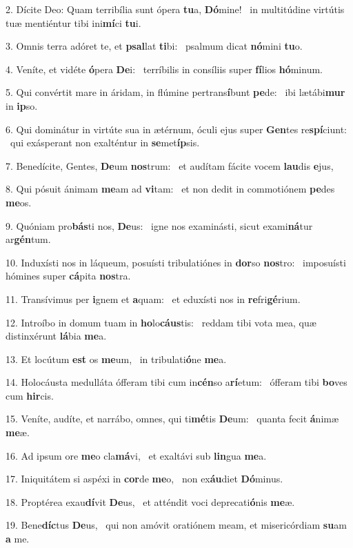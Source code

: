 2. Dícite Deo: Quam terribília sunt ópera \textbf{tu}a, \textbf{Dó}mine! \ast\  in multitúdine virtútis tuæ mentiéntur tibi ini\textbf{mí}ci \textbf{tu}i.\

3. Omnis terra adóret te, et \textbf{psal}lat \textbf{ti}bi: \ast\  psalmum dicat \textbf{nó}mini \textbf{tu}o.\

4. Veníte, et vidéte \textbf{ó}pera \textbf{De}i: \ast\  terríbilis in consíliis super \textbf{fí}lios \textbf{hó}minum.\

5. Qui convértit mare in áridam, in flúmine pertrans\textbf{í}bunt \textbf{pe}de: \ast\  ibi lætábi\textbf{mur} in \textbf{ip}so.\

6. Qui dominátur in virtúte sua in ætérnum, óculi ejus super \textbf{Gen}tes re\textbf{spí}ciunt: \ast\  qui exásperant non exalténtur in \textbf{se}met\textbf{íp}sis.\

7. Benedícite, Gentes, \textbf{De}um \textbf{nos}trum: \ast\  et audítam fácite vocem \textbf{lau}dis \textbf{e}jus,\

8. Qui pósuit ánimam \textbf{me}am ad \textbf{vi}tam: \ast\  et non dedit in commotiónem \textbf{pe}des \textbf{me}os.\

9. Quóniam pro\textbf{bás}ti nos, \textbf{De}us: \ast\  igne nos examinásti, sicut exami\textbf{ná}tur ar\textbf{gén}tum.\

10. Induxísti nos in láqueum, posuísti tribulatiónes in \textbf{dor}so \textbf{nos}tro: \ast\  imposuísti hómines super \textbf{cá}pita \textbf{nos}tra.\

11. Transívimus per \textbf{i}gnem et \textbf{a}quam: \ast\  et eduxísti nos in \textbf{re}fri\textbf{gé}rium.\

12. Introíbo in domum tuam in \textbf{ho}lo\textbf{cáus}tis: \ast\  reddam tibi vota mea, quæ distinxérunt \textbf{lá}bia \textbf{me}a.\

13. Et locútum \textbf{est} os \textbf{me}um, \ast\  in tribulati\textbf{ó}ne \textbf{me}a.\

14. Holocáusta medulláta ófferam tibi cum in\textbf{cén}so a\textbf{rí}etum: \ast\  ófferam tibi \textbf{bo}ves cum \textbf{hir}cis.\

15. Veníte, audíte, et narrábo, omnes, qui ti\textbf{mé}tis \textbf{De}um: \ast\  quanta fecit \textbf{á}nimæ \textbf{me}æ.\

16. Ad ipsum ore \textbf{me}o cla\textbf{má}vi, \ast\  et exaltávi sub \textbf{lin}gua \textbf{me}a.\

17. Iniquitátem si aspéxi in \textbf{cor}de \textbf{me}o, \ast\  non ex\textbf{áu}diet \textbf{Dó}minus.\

18. Proptérea exau\textbf{dí}vit \textbf{De}us, \ast\  et atténdit voci deprecati\textbf{ó}nis \textbf{me}æ.\

19. Bene\textbf{díc}tus \textbf{De}us, \ast\  qui non amóvit oratiónem meam, et misericórdiam \textbf{su}am \textbf{a} me.\

